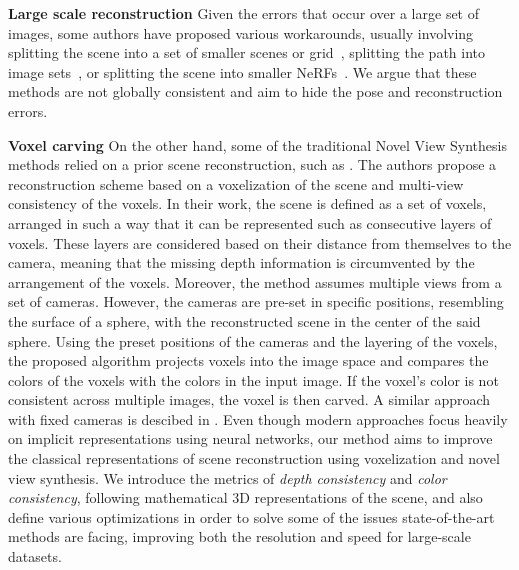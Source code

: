 \documentclass{article}
\begin{document}
\textbf{Large scale reconstruction} Given the errors that occur over a large set of images, some authors have proposed various workarounds, usually involving splitting the scene into a set of smaller scenes or grid~\cite{tancik2022block,turki2023suds,xu2023gridguided}, splitting the path into image sets~\cite{meuleman2023localrf}, or splitting the scene into smaller NeRFs~\cite{zhang2023nerflets}. We argue that these methods are not globally consistent and aim to hide the pose and reconstruction errors.


\textbf{Voxel carving} On the other hand, some of the traditional Novel View Synthesis methods relied on a prior scene reconstruction, such as \cite{seitz1999photorealistic}. The authors propose a reconstruction scheme based on a voxelization of the scene and multi-view consistency of the voxels. In their work, the scene is defined as a set of voxels, arranged in such a way that it can be represented such as consecutive layers of voxels. These layers are considered based on their distance from themselves to the camera, meaning that the missing depth information is circumvented by the arrangement of the voxels. Moreover, the method assumes multiple views from a set of cameras. However, the cameras are pre-set in specific positions, resembling the surface of a sphere, with the reconstructed scene in the center of the said sphere. Using the preset positions of the cameras and the layering of the voxels, the proposed algorithm projects voxels into the image space and compares the colors of the voxels with the colors in the input image. If the voxel's color is not consistent across multiple images, the voxel is then carved. A similar approach with fixed cameras is descibed in \cite{balan2003voxel}. Even though modern approaches focus heavily on implicit representations using neural networks, our method aims to improve the classical representations of scene reconstruction using voxelization and novel view synthesis. We introduce the metrics of \textit{depth consistency} and \textit{color consistency}, following mathematical 3D representations of the scene, and also define various optimizations in order to solve some of the issues state-of-the-art methods are facing, improving both the resolution and speed for large-scale datasets.

\end{document}
